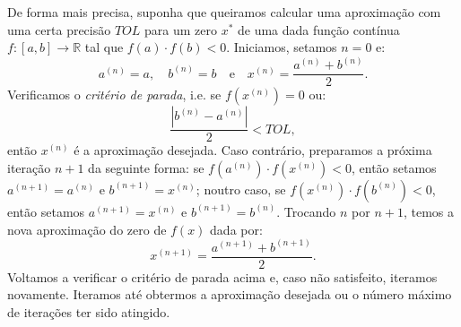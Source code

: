 De forma mais precisa, suponha que queiramos calcular uma aproximação com uma certa precisão $TOL$ para um zero $x^*$ de uma dada função contínua $f:[a, b]\to\mathbb{R}$ tal que $f(a)\cdot f(b) < 0$. Iniciamos, setamos $n=0$ e:
\begin{equation*}
  a^{(n)} = a,\quad b^{(n)} = b\quad\text{e}\quad x^{(n)} = \frac{a^{(n)} + b^{(n)}}{2}.
\end{equation*}
Verificamos o \emph{critério de parada}, i.e. se $f(x^{(n)}) = 0$ ou:
\begin{equation*}
  \displaystyle \frac{|b^{(n)} - a^{(n)}|}{2} < TOL,
\end{equation*}
então $x^{(n)}$ é a aproximação desejada. Caso contrário, preparamos a próxima iteração $n+1$ da seguinte forma: se $f(a^{(n)})\cdot f(x^{(n)}) < 0$, então setamos $a^{(n+1)} = a^{(n)}$ e $b^{(n+1)} = x^{(n)}$; noutro caso, se $f(x^{(n)})\cdot f(b^{(n)}) < 0$, então setamos $a^{(n+1)} = x^{(n)}$ e $b^{(n+1)} = b^{(n)}$. Trocando $n$ por $n+1$, temos a nova aproximação do zero de $f(x)$ dada por:
\begin{equation*}
  x^{(n+1)} = \frac{a^{(n+1)} + b^{(n+1)}}{2}.
\end{equation*}
Voltamos a verificar o critério de parada acima e, caso não satisfeito, iteramos novamente. Iteramos até obtermos a aproximação desejada ou o número máximo de iterações ter sido atingido.


